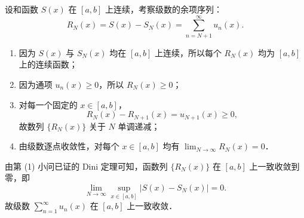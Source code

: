 \begin{myproof}
    设和函数 $S(x)$ 在 $[a, b]$ 上连续，考察级数的余项序列：
    \begin{equation}
        R_N(x) = S(x) - S_N(x) = \sum_{n=N+1}^\infty u_n(x).
    \end{equation}
    \begin{enumerate}
        \item 因为 $S(x)$ 与 $S_N(x)$ 均在 $[a, b]$ 上连续，所以每个 $R_N(x)$ 均为 $[a, b]$ 上的连续函数；
        \item 因为通项 $u_n(x) \geqslant 0$，所以 $R_N(x) \geqslant 0$；
        \item 对每一个固定的 $x \in [a, b]$，
              \begin{equation}
                  R_N(x) - R_{N+1}(x) = u_{N+1}(x) \geqslant 0,
              \end{equation}
              故数列 $\{R_N(x)\}$ 关于 $N$ 单调递减；
        \item 由级数逐点收敛性，对每个 $x \in [a, b]$ 均有 $\lim_{N\to\infty} R_N(x) = 0$．
    \end{enumerate}
    由第 (1) 小问已证的 Dini 定理可知，函数列 $\{R_N(x)\}$ 在 $[a, b]$ 上一致收敛到零，即
    \begin{equation}
        \lim_{N\to\infty} \sup_{x \in [a, b]} |S(x) - S_N(x)| = 0.
    \end{equation}
    故级数 $\sum_{n=1}^\infty u_n(x)$ 在 $[a, b]$ 上一致收敛．
\end{myproof}

\endinput

